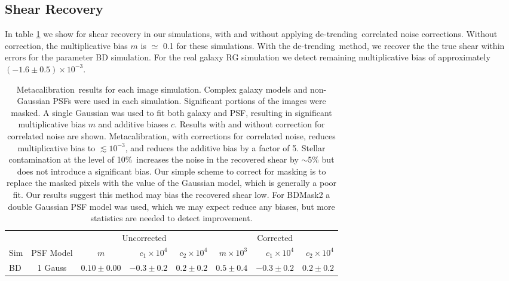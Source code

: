 \documentclass[usegraphicx,usenatbib]{mn2e}
\newcommand{\Mcal}{Metacalibration}
\newcommand{\nsimNstarperc}{10\%}
\newcommand{\detrend}{de-trending}
\newcommand{\rgbias}{$(-1.6 \pm 0.5) \times 10^{-3}$}
\begin{document}
\subsection{Shear Recovery}

In table \ref{tab:results} we show for shear recovery in our simulations, with
and without applying \detrend\ correlated noise corrections.  Without
correction, the multiplicative bias $m$ is $\simeq$ 0.1 for these simulations.
With the \detrend\ method, we recover the the true shear within errors for the
parameter BD simulation. For the real galaxy RG simulation we detect remaining
multiplicative bias of approximately \rgbias.

\begin{table}
    \centering
    \caption{\Mcal\ results for each image simulation.  Complex galaxy models
        and non-Gaussian PSFs were used in each simulation.  Significant
        portions of the images were masked.  A single Gaussian was used
    to fit both galaxy and PSF, resulting in significant multiplicative 
    bias $m$ and additive biases $c$.  Results with and without correction
    for correlated noise are shown.  \Mcal, with corrections for correlated noise,
    reduces multiplicative bias to $\lesssim 10^{-3}$, and reduces the additive
    bias by a factor of 5.  
    Stellar contamination at the level of \nsimNstarperc\ increases
    the noise in the recovered shear by $\sim$5\% but does not introduce 
    a significant bias.  
    Our simple scheme to correct for masking is to
    replace the masked pixels with the value of the Gaussian model, which is generally
    a poor fit.  Our results suggest this method may bias the recovered shear low.
    For BDMask2 a double Gaussian PSF model was used, which we may expect reduce any biases, but
    more statistics are needed to detect improvement.
    \label{tab:results}}
    \begin{tabular}{ |l|  |c| c|r|r|  r|r|r|}
        \hline
        & & \multicolumn{3}{c}{Uncorrected} & \multicolumn{3}{c}{Corrected} \\
        Sim & PSF Model & $m$ & $c_1 \times 10^4$ & $c_2 \times 10^4$ & $m \times 10^{3}$ & $c_1 \times 10^4$ & $c_2 \times 10^4$ \\
        \hline
        BD              & 1 Gauss & $0.10 \pm 0.00$ & $-0.3 \pm 0.2$ & $0.2 \pm 0.2$    & $ 0.5 \pm 0.4$ & $-0.3 \pm 0.2$ & $0.2 \pm 0.2$  \\

\end{tabular}
\end{table}
\end{document}
